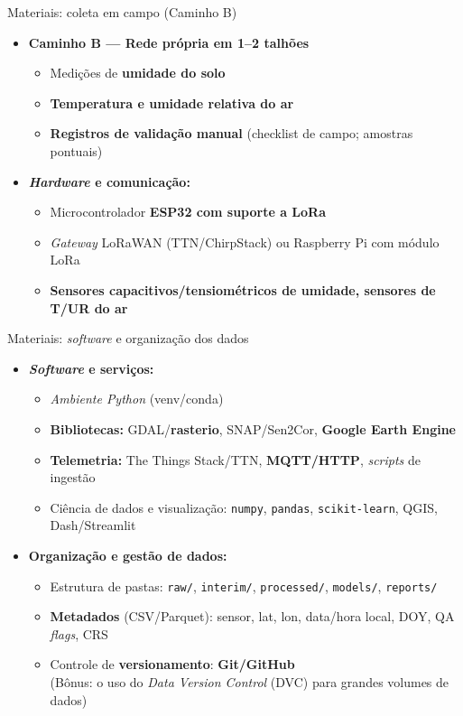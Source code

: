 \documentclass[aspectratio=169]{beamer}
\begin{document}
\begin{frame}{Materiais: coleta em campo (Caminho B)}
  \begin{itemize}
    \item \textbf{Caminho B --- Rede própria em 1--2 talhões}
      \begin{itemize}
        \item Medições de \textbf{umidade do solo}
        \item \textbf{Temperatura e umidade relativa do ar}
        \item \textbf{Registros de validação manual} (checklist de campo; amostras pontuais)
      \end{itemize}
    \item \textbf{\emph{Hardware} e comunicação:}
      \begin{itemize}
        \item Microcontrolador \textbf{ESP32 com suporte a LoRa}
        \item \emph{Gateway} LoRaWAN (TTN/ChirpStack) ou Raspberry Pi com módulo LoRa
        \item \textbf{Sensores capacitivos/tensiométricos de umidade, sensores de T/UR do ar}
      \end{itemize}
  \end{itemize}
\end{frame}

\begin{frame}{Materiais: \emph{software} e organização dos dados}
  \begin{itemize}
    \item \textbf{\emph{Software} e serviços:}
      \begin{itemize}
        \item \emph{Ambiente Python} (venv/conda)
        \item \textbf{Bibliotecas:} GDAL/\textbf{rasterio}, SNAP/Sen2Cor, \textbf{Google Earth Engine}
        \item \textbf{Telemetria:} The Things Stack/TTN, \textbf{MQTT/HTTP}, \emph{scripts} de ingestão
        \item Ciência de dados e visualização: \texttt{numpy}, \texttt{pandas}, \texttt{scikit-learn}, QGIS, Dash/Streamlit
      \end{itemize}
    \item \textbf{Organização e gestão de dados:}
      \begin{itemize}
        \item Estrutura de pastas: \texttt{raw/}, \texttt{interim/}, \texttt{processed/}, \texttt{models/}, \texttt{reports/}
        \item \textbf{Metadados} (CSV/Parquet): sensor, lat, lon, data/hora local, DOY, QA \emph{flags}, CRS
        \item Controle de \textbf{versionamento}: \textbf{Git/GitHub}
        \\{\scriptsize (Bônus: o uso do \emph{Data Version Control} (DVC) para grandes volumes de dados)}
      \end{itemize}
  \end{itemize}
\end{frame}
\end{document}
